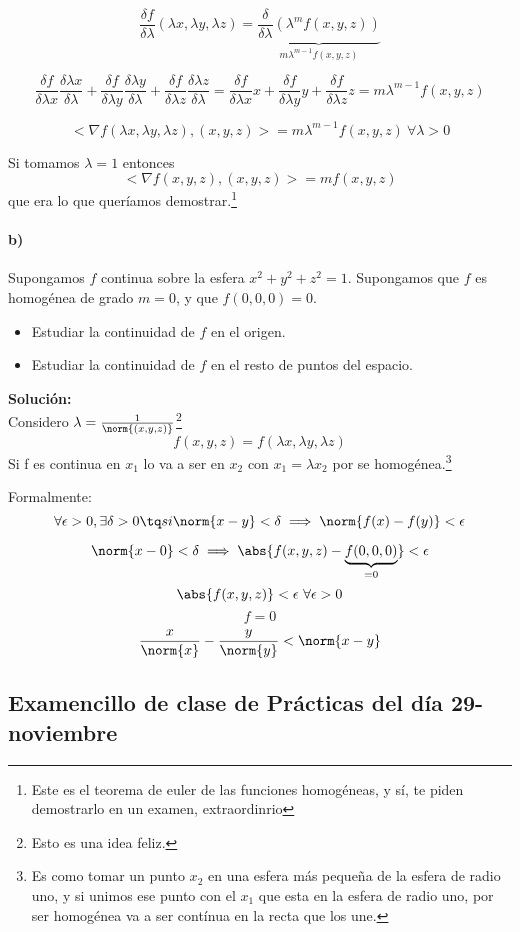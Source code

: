 $$\frac{\delta f}{\delta \lambda}(\lambda x, \lambda y, \lambda z) = \underbrace{\frac{\delta}{\delta \lambda}(\lambda^mf(x,y,z))}_{m\lambda^{m-1}f(x,y,z)}$$

$$\frac{\delta f}{\delta \lambda x}\frac{\delta \lambda x}{\delta \lambda} + \frac{\delta f}{\delta \lambda y}\frac{\delta \lambda y}{\delta \lambda} + \frac{\delta f}{\delta \lambda z}\frac{\delta \lambda z}{\delta \lambda} = \frac{\delta f}{\delta \lambda x}x + \frac{\delta f}{\delta \lambda y}y + \frac{\delta f}{\delta \lambda z}z = m\lambda ^{m-1} f(x,y,z) $$

$$<\nabla f(\lambda x,\lambda y,\lambda z), (x,y,z) > = m\lambda^{m-1} f(x,y,z)\ \forall \lambda > 0$$

Si tomamos $\lambda = 1$ entonces $$<\nabla f(x,y,z), (x,y,z) > = mf(x,y,z)$$ que era lo que queríamos demostrar.\footnote{Este es el teorema de euler de las funciones homogéneas, y sí, te piden demostrarlo en un examen, extraordinrio}

\paragraph{b)} Supongamos $f$ continua sobre la esfera ${x^2+y^2+z^2=1}$. Supongamos que $f$ es homogénea de grado $m = 0$, y que $f(0,0,0) = 0$.

\begin{itemize}
\item Estudiar la continuidad de $f$ en el origen.
\item Estudiar la continuidad de $f$ en el resto de puntos del espacio.
\end{itemize}

\textbf{Solución:}\\
Considero $\lambda = \frac{1}{\norm{(x,y,z)}}$\footnote{Esto es una idea feliz.}\\
$$f(x,y,z) = f(\lambda x, \lambda y, \lambda z)$$
Si f es continua en $x_1$ lo va a ser en $x_2$ con $x_1 = \lambda x_2$ por se homogénea.\footnote{Es como tomar un punto $x_2$ en una esfera más pequeña de la esfera de radio uno, y si unimos ese punto con el $x_1$ que esta en la esfera de radio uno, por ser homogénea va a ser contínua en la recta que los une.}

Formalmente:
$$\forall \epsilon > 0, \exists \delta > 0 \tq si \norm{x-y} < \delta \implies \norm{f(x) - f(y)} < \epsilon$$

$$\norm{x - 0} < \delta \implies \abs{f(x,y,z) - \underbrace{f(0,0,0)}_{=0}} < \epsilon$$
$$\abs{f(x,y,z)} < \epsilon\ \forall \epsilon > 0$$
$$ f = 0$$
$$ \frac{x}{\norm{x}} - \frac{y}{\norm{y}} < \norm{x-y}$$


\subsection{Examencillo de clase de Pr\'acticas del d\'ia 29-noviembre}
